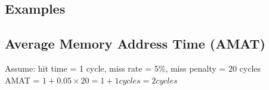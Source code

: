 \documentclass{../cheatsheet}
\begin{document}
\begin{multicols*}{2}
    \section{Examples}
    \subsection{Average Memory Address Time (AMAT)}
    Assume: hit time = 1 cycle, miss rate = 5\%, miss penalty = 20 cycles\\
    AMAT = $1 + 0.05 \times 20 = 1 + 1 cycles = 2 cycles$
\end{multicols*}
\end{document}
